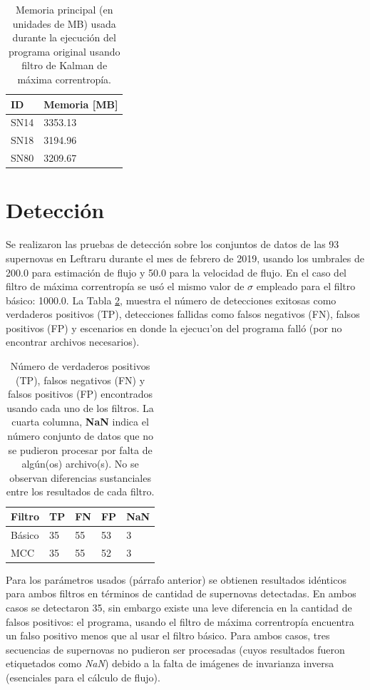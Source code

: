 \begin{table}[h!]
\centering
\caption{Memoria principal (en unidades de MB) usada durante la ejecuci\'on del programa original usando filtro de Kalman de m\'axima correntrop\'ia.}
\begin{tabular}{|l|l|}
\hline
\textbf{ID} & Memoria [MB]\\\hline\hline
SN14 & 3353.13\\\hline
SN18 & 3194.96\\\hline
SN80 & 3209.67\\\hline
\end{tabular}
\label{tab:mem2}
\end{table}

\section{Detecci\'on}
Se realizaron las pruebas de detecci\'on sobre los conjuntos de datos de las 93 supernovas en Leftraru durante el mes de febrero de 2019, usando los  umbrales de 200.0 para estimaci\'on de flujo y 50.0 para la velocidad de flujo. En el caso del filtro de m\'axima correntrop\'ia se us\'o el mismo valor de $\sigma$ empleado para el filtro b\'asico: 1000.0. La Tabla \ref{tab:tpfn}, muestra el n\'umero de detecciones exitosas como verdaderos positivos (TP), detecciones fallidas como falsos negativos (FN), falsos positivos (FP) y escenarios en donde la ejecuc\i'on del programa fall\'o (por no encontrar archivos necesarios). 
\bigskip

\begin{table}[h!]
\centering
\caption{N\'umero de verdaderos positivos (TP), falsos negativos (FN) y falsos positivos (FP) encontrados usando cada uno de los filtros. La cuarta columna, \textbf{NaN} indica el n\'umero conjunto de datos que no se pudieron procesar por falta de alg\'un(os) archivo(s). No se observan diferencias sustanciales entre los resultados de cada filtro.}
\begin{tabular}{|l|l|l|l|l|}
\hline
\textbf{Filtro} & \textbf{TP} & \textbf{FN} & \textbf{FP}  & \textbf{NaN}\\ \hline
Básico          & 35          & 55         & 53 & 3 \\ \hline
MCC             & 35          & 55         & 52 & 3 \\ \hline
\end{tabular}
\label{tab:tpfn}
\end{table}

Para los par\'ametros usados (p\'arrafo anterior) se obtienen resultados id\'enticos para ambos filtros en t\'erminos de cantidad de supernovas detectadas. En ambos casos se detectaron 35, sin embargo existe una leve diferencia en la cantidad de falsos positivos: el programa, usando el filtro de m\'axima correntrop\'ia encuentra un falso positivo menos que al usar el filtro b\'asico. Para ambos casos, tres secuencias de supernovas no pudieron ser procesadas (cuyos resultados fueron etiquetados como \textit{NaN}) debido a la falta de im\'agenes de invarianza inversa (esenciales para el c\'alculo de flujo).  %
\bigskip

